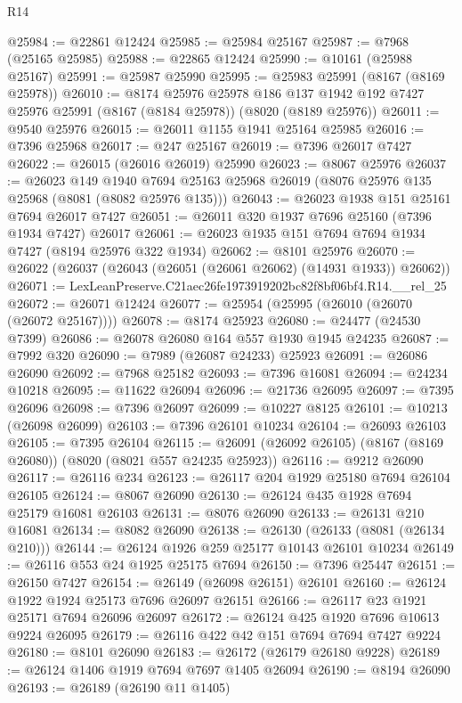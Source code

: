 \begin{lexlean}{R14}
\begin{coremodule}
@25984 := @22861 @12424
@25985 := @25984 @25167
@25987 := @7968 (@25165 @25985)
@25988 := @22865 @12424
@25990 := @10161 (@25988 @25167)
@25991 := @25987 @25990
@25995 := @25983 @25991 (@8167 (@8169 @25978))
@26010 := @8174
    @25976
    @25978
    @186
    @137
    @1942
    @192
    @7427
    @25976
    @25991
    (@8167 (@8184 @25978))
    (@8020 (@8189 @25976))
@26011 := @9540 @25976
@26015 := @26011 @1155 @1941 @25164 @25985
@26016 := @7396 @25968
@26017 := @247 @25167
@26019 := @7396 @26017 @7427
@26022 := @26015 (@26016 @26019) @25990
@26023 := @8067 @25976
@26037 := @26023
    @149
    @1940
    @7694
    @25163
    @25968
    @26019
    (@8076 @25976 @135 @25968 (@8081 (@8082 @25976 @135)))
@26043 := @26023 @1938 @151 @25161 @7694 @26017 @7427
@26051 := @26011 @320 @1937 @7696 @25160 (@7396 @1934 @7427) @26017
@26061 := @26023 @1935 @151 @7694 @7694 @1934 @7427 (@8194 @25976 @322 @1934)
@26062 := @8101 @25976
@26070 := @26022 (@26037 (@26043 (@26051 (@26061 @26062) (@14931 @1933)) @26062))
@26071 := LexLeanPreserve.C21aec26fe1973919202bc82f8bf06bf4.R14.__rel_25
@26072 := @26071 @12424
@26077 := @25954 (@25995 (@26010 (@26070 (@26072 @25167))))
@26078 := @8174 @25923
@26080 := @24477 (@24530 @7399)
@26086 := @26078 @26080 @164 @557 @1930 @1945 @24235
@26087 := @7992 @320
@26090 := @7989 (@26087 @24233) @25923
@26091 := @26086 @26090
@26092 := @7968 @25182
@26093 := @7396 @16081
@26094 := @24234 @10218
@26095 := @11622 @26094
@26096 := @21736 @26095
@26097 := @7395 @26096
@26098 := @7396 @26097
@26099 := @10227 @8125
@26101 := @10213 (@26098 @26099)
@26103 := @7396 @26101 @10234
@26104 := @26093 @26103
@26105 := @7395 @26104
@26115 := @26091 (@26092 @26105) (@8167 (@8169 @26080)) (@8020 (@8021 @557 @24235 @25923))
@26116 := @9212 @26090
@26117 := @26116 @234
@26123 := @26117 @204 @1929 @25180 @7694 @26104 @26105
@26124 := @8067 @26090
@26130 := @26124 @435 @1928 @7694 @25179 @16081 @26103
@26131 := @8076 @26090
@26133 := @26131 @210 @16081
@26134 := @8082 @26090
@26138 := @26130 (@26133 (@8081 (@26134 @210)))
@26144 := @26124 @1926 @259 @25177 @10143 @26101 @10234
@26149 := @26116 @553 @24 @1925 @25175 @7694
@26150 := @7396 @25447
@26151 := @26150 @7427
@26154 := @26149 (@26098 @26151) @26101
@26160 := @26124 @1922 @1924 @25173 @7696 @26097 @26151
@26166 := @26117 @23 @1921 @25171 @7694 @26096 @26097
@26172 := @26124 @425 @1920 @7696 @10613 @9224 @26095
@26179 := @26116 @422 @42 @151 @7694 @7694 @7427 @9224
@26180 := @8101 @26090
@26183 := @26172 (@26179 @26180 @9228)
@26189 := @26124 @1406 @1919 @7694 @7697 @1405 @26094
@26190 := @8194 @26090
@26193 := @26189 (@26190 @11 @1405)

\end{coremodule}
\end{lexlean}
